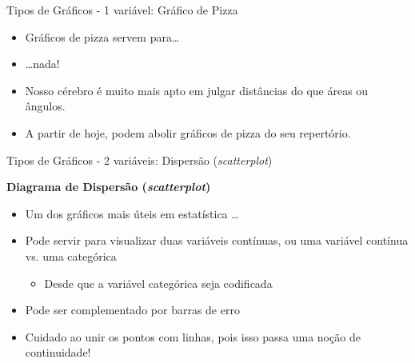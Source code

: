 \documentclass{beamer}\usepackage[]{graphicx}\usepackage[]{color}
\begin{document}
\begin{frame}{Tipos de Gráficos - 1 variável: Gráfico de Pizza}
  
\begin{itemize}
  \item Gráficos de pizza servem para\ldots \pause
  \vfill
  \item  \dots nada!
  \vfill
  \item Nosso cérebro é muito mais apto em julgar distâncias do que áreas ou ângulos. \pause
  \vfill
  \item A partir de hoje, podem abolir gráficos de pizza do seu repertório.
\end{itemize}

\end{frame} 

\begin{frame}{Tipos de Gráficos - 2 variáveis: Dispersão (\emph{scatterplot})}

\textbf{Diagrama de Dispersão (\emph{scatterplot})}

\begin{itemize}
  \item Um dos gráficos mais úteis em estatística \ldots \pause
  \vfill
  \item   Pode servir para visualizar duas variáveis contínuas, ou uma variável contínua vs. uma categórica
  \begin{itemize}
  \item Desde que a variável categórica seja codificada
  \end{itemize}
  \vfill
  \item Pode ser complementado por barras de erro \pause
  \vfill
  \item Cuidado ao unir os pontos com linhas, pois isso passa uma noção de continuidade!
\end{itemize}

\end{frame} 
\end{document}
